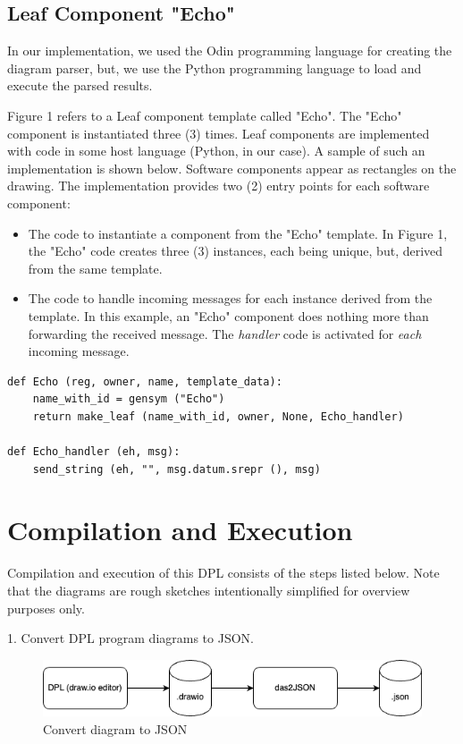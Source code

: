 \documentclass[10pt,anonymous,review]{acmart}
\begin{document}
\subsection{Leaf Component "Echo"}
In our implementation, we used the Odin programming language for
creating the diagram parser, but, we use the Python programming
language to load and execute the parsed results.

Figure 1 refers to a Leaf component template called "Echo". The "Echo"
component is instantiated three (3) times. Leaf components are
implemented with code in some host language (Python, in our case). A
sample of such an implementation is shown below. Software components
appear as rectangles on the drawing. The implementation provides two (2)
entry points for each software component:
\begin{itemize}
\item The code to instantiate a component from the "Echo" template. In Figure
1, the "Echo" code creates three (3) instances, each being unique, but,
derived from the same template.

\item The code to handle incoming messages for each instance derived from the
template. In this example, an "Echo" component does nothing more than
forwarding the received message. The \emph{handler} code is activated for
\emph{each} incoming message.
\end{itemize}

\begin{verbatim}
def Echo (reg, owner, name, template_data):
    name_with_id = gensym ("Echo")
    return make_leaf (name_with_id, owner, None, Echo_handler)

def Echo_handler (eh, msg):
    send_string (eh, "", msg.datum.srepr (), msg)
\end{verbatim}

\section{Compilation and Execution}
Compilation and execution of this DPL consists of the steps listed below. Note that the diagrams are rough sketches intentionally simplified
for overview purposes only.

1. Convert DPL program diagrams to JSON.

  \begin{figure}[h]
    \centering
    \includegraphics[width=0.8\linewidth]{./media/image2.png}
    \caption{Convert diagram to JSON}
    \label{fig:convert_to_json}
  \end{figure}
\end{document}
